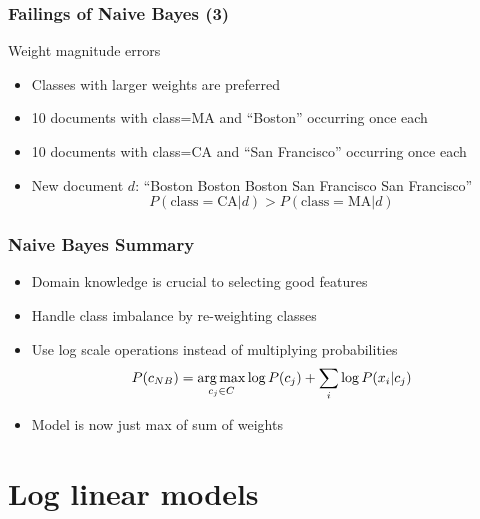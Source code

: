 \begin{frame}
\frametitle{Failings of Naive Bayes (3)}
\begin{block}{Weight magnitude errors}
\begin{itemize}[<+->]
\item Classes with larger weights are preferred
\item 10 documents with class=MA and “Boston” occurring once each
\item 10 documents with class=CA and “San Francisco” occurring once each
\item New document $d$: “Boston Boston Boston San Francisco San Francisco”
\pause
\\
\begin{equation*}
P(\text{class}=\text{CA} | d) > P(\text{class} = \text{MA} | d)
\end{equation*}
\end{itemize}
\end{block}
\end{frame}

\begin{frame}
\frametitle{Naive Bayes Summary}
\begin{itemize}[<+->]
\item Domain knowledge is crucial to selecting good features
\item Handle class imbalance by re-weighting classes
\item Use log scale operations instead of multiplying probabilities
\begin{equation*}
P(c_{NB}) = \operatorname*{arg\,max}_{c_j \in C} \log P(c_j) + \sum_{i} \log P(x_i | c_j)
\end{equation*}
\item Model is now just max of sum of weights
\end{itemize}
\end{frame}


\author{Angel Xuan Chang \\ 
  {} \\
  {\color{gray}{adapted from lecture slides from Anoop Sarkar}}
}

\section{Log linear models}
\frame{\tableofcontents[currentsection]}

